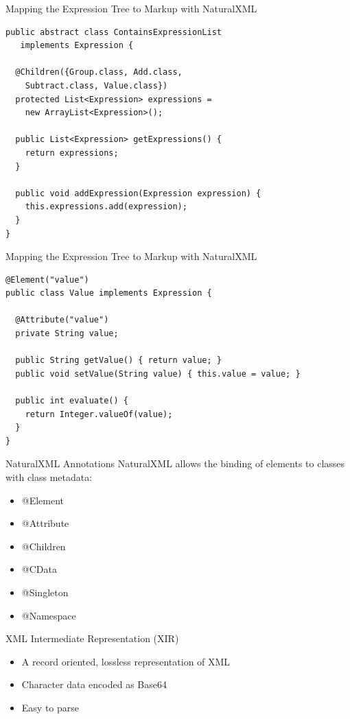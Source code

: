 \documentclass{beamer}
\begin{document}
\begin{frame}[fragile]{Mapping the Expression Tree to Markup with NaturalXML}
\begin{lstlisting}
public abstract class ContainsExpressionList 
   implements Expression {
    
  @Children({Group.class, Add.class, 
    Subtract.class, Value.class})
  protected List<Expression> expressions = 
    new ArrayList<Expression>();
  
  public List<Expression> getExpressions() {
    return expressions;
  }
  
  public void addExpression(Expression expression) {
    this.expressions.add(expression);
  }
}
\end{lstlisting}
\end{frame}

\begin{frame}[fragile]{Mapping the Expression Tree to Markup with NaturalXML}
\begin{lstlisting}
@Element("value")
public class Value implements Expression {
	
  @Attribute("value")
  private String value;
  
  public String getValue() { return value; }
  public void setValue(String value) { this.value = value; }
  
  public int evaluate() {
    return Integer.valueOf(value);
  }
}
\end{lstlisting}
\end{frame}

\begin{frame}{NaturalXML Annotations}
NaturalXML allows the binding of elements to classes with class metadata:
  \begin{itemize}
    \item @Element
    \item @Attribute
    \item @Children
    \item @CData
    \item @Singleton
    \item @Namespace
  \end{itemize}
\end{frame}

\begin{frame}{XML Intermediate Representation (XIR)}
\begin{itemize}
  \item A record oriented, lossless representation of XML
  \item Character data encoded as Base64
  \item Easy to parse
\end{itemize}
\end{frame}
\end{document}

